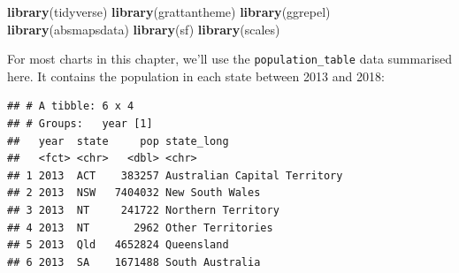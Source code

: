 \documentclass[]{book}
\newenvironment{Shaded}{\begin{snugshade}}{\end{snugshade}}
\newcommand{\CommentTok}[1]{\textcolor[rgb]{0.56,0.35,0.01}{\textit{#1}}}
\newcommand{\DataTypeTok}[1]{\textcolor[rgb]{0.13,0.29,0.53}{#1}}
\newcommand{\KeywordTok}[1]{\textcolor[rgb]{0.13,0.29,0.53}{\textbf{#1}}}
\newcommand{\NormalTok}[1]{#1}
\newcommand{\OperatorTok}[1]{\textcolor[rgb]{0.81,0.36,0.00}{\textbf{#1}}}
\newcommand{\StringTok}[1]{\textcolor[rgb]{0.31,0.60,0.02}{#1}}
\begin{document}
\begin{Shaded}
\begin{Highlighting}[]
\KeywordTok{library}\NormalTok{(tidyverse)}
\KeywordTok{library}\NormalTok{(grattantheme)}
\KeywordTok{library}\NormalTok{(ggrepel)}
\KeywordTok{library}\NormalTok{(absmapsdata)}
\KeywordTok{library}\NormalTok{(sf)}
\KeywordTok{library}\NormalTok{(scales)}
\end{Highlighting}
\end{Shaded}

For most charts in this chapter, we'll use the \texttt{population\_table} data summarised here. It contains the population in each state between 2013 and 2018:

\begin{Shaded}
\end{Shaded}

\begin{verbatim}
## # A tibble: 6 x 4
## # Groups:   year [1]
##   year  state     pop state_long                  
##   <fct> <chr>   <dbl> <chr>                       
## 1 2013  ACT    383257 Australian Capital Territory
## 2 2013  NSW   7404032 New South Wales             
## 3 2013  NT     241722 Northern Territory          
## 4 2013  NT       2962 Other Territories           
## 5 2013  Qld   4652824 Queensland                  
## 6 2013  SA    1671488 South Australia
\end{verbatim}
\end{document}
